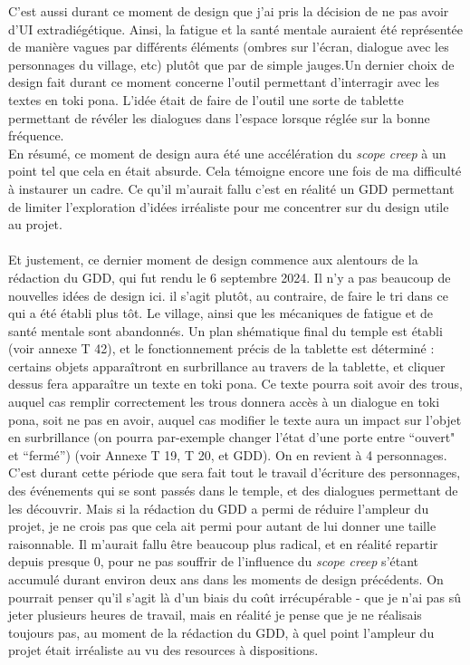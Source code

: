 \documentclass{scrartcl}
\let\emph\relax %
\begin{document}
	C'est aussi durant ce moment de design que j'ai pris la décision de ne pas avoir d'UI extradiégétique. Ainsi, la fatigue et la santé mentale auraient été représentée de manière vagues par différents éléments (ombres sur l'écran, dialogue avec les personnages du village, etc) plutôt que par de simple jauges.Un dernier choix de design fait durant ce moment concerne l'outil permettant d'interragir avec les textes en toki pona. L'idée était de faire de l'outil une sorte de tablette permettant de révéler les dialogues dans l'espace lorsque réglée sur la bonne fréquence.\\
	En résumé, ce moment de design aura été une accélération du \textit{scope creep} à un point tel que cela en était absurde. Cela témoigne encore une fois de ma difficulté à instaurer un cadre. Ce qu'il m'aurait fallu c'est en réalité un GDD permettant de limiter l'exploration d'idées irréaliste pour me concentrer sur du design utile au projet.\\
	
	\emph{Le temple - Revenir du scope creep par le GDD}\\
	Et justement, ce dernier moment de design commence aux alentours de la rédaction du GDD, qui fut rendu le 6 septembre 2024. Il n'y a pas beaucoup de nouvelles idées de design ici. il s'agit plutôt, au contraire, de faire le tri dans ce qui a été établi plus tôt. Le village, ainsi que les mécaniques de fatigue et de santé mentale sont abandonnés. Un plan shématique final du temple est établi (voir annexe T 42), et le fonctionnement précis de la tablette est déterminé : certains objets apparaîtront en surbrillance au travers de la tablette, et cliquer dessus fera apparaître un texte en toki pona. Ce texte pourra soit avoir des trous, auquel cas remplir correctement les trous donnera accès à un dialogue en toki pona, soit ne pas en avoir, auquel cas modifier le texte aura un impact sur l'objet en surbrillance (on pourra par-exemple changer l'état d'une porte entre “ouvert" et “fermé”) (voir Annexe T 19, T 20, et GDD). On en revient à 4 personnages. C'est durant cette période que sera fait tout le travail d'écriture des personnages, des événements qui se sont passés dans le temple, et des dialogues permettant de les découvrir. Mais si la rédaction du GDD a permi de réduire l'ampleur du projet, je ne crois pas que cela ait permi pour autant de lui donner une taille raisonnable. Il m'aurait fallu être beaucoup plus radical, et en réalité repartir depuis presque 0, pour ne pas souffrir de l'influence du \textit{scope creep} s'étant accumulé durant environ deux ans dans les moments de design précédents. On pourrait penser qu'il s'agit là d'un biais du coût irrécupérable - que je n'ai pas sû jeter plusieurs heures de travail, mais en réalité je pense que je ne réalisais toujours pas, au moment de la rédaction du GDD, à quel point l'ampleur du projet était irréaliste au vu des resources à dispositions.
	
\end{document}
